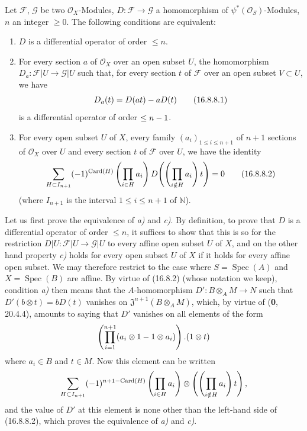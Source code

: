 \begin{proposition}[16.8.8]
\label{IV.16.8.8}
Let $\mathscr{F}$, $\mathscr{G}$ be two $\mathcal{O}_X$-Modules,
$D:\mathscr{F}\to\mathscr{G}$ a homomorphism of
$\psi^*(\mathcal{O}_S)$-Modules, $n$ an integer $\geq0$. The following
conditions are equivalent:
\begin{enumerate}
  \item[\textup{a)}] $D$ is a differential operator of order $\leq n$.
  \item[\textup{b)}] For every section $a$ of $\mathcal{O}_X$ over an open subset
  $U$, the homomorphism $D_a:\mathscr{F}|U\to\mathscr{G}|U$ such that, for
  every section $t$ of $\mathscr{F}$ over an open subset $V\subset U$, we
  have
  \[
    D_a(t)=D(at)- aD(t)
    \tag{16.8.8.1}
    \label{IV.16.8.8.1}
  \]
  is a differential operator of order $\leq n- 1$.
  \item[\textup{c)}] For every open subset $U$ of $X$, every family
  $(a_i)_{1\leq i\leq n+1}$ of $n+1$ sections of $\mathcal{O}_X$ over
  $U$ and every section $t$ of $\mathscr{F}$ over $U$, we have
  the identity
  \[
    \sum_{H\subset I_{n+1}}(- 1)^{\operatorname{Card}(H)}
    \left(\prod_{i\in H}a_i\right)
    D\!\left(\left(\prod_{i\notin H}a_i\right)t\right)=0
    \tag{16.8.8.2}
    \label{IV.16.8.8.2}
  \]
  (where $I_{n+1}$ is the interval $1\leq i\leq n+1$ of $\mathbb{N}$).
\end{enumerate}
\end{proposition}

Let us first prove the equivalence of \emph{a)} and \emph{c)}. By definition, to prove that
$D$ is a differential operator of order $\leq n$, it suffices to show that
this is so for the restriction
$D|U:\mathscr{F}|U\to\mathscr{G}|U$ to every affine open subset $U$ of $X$,
and on the other hand property \emph{c)} holds for every open subset $U$ of $X$ if
it holds for every affine open subset. We may therefore restrict to the case
where $S=\operatorname{Spec}(A)$ and $X=\operatorname{Spec}(B)$ are affine.
By virtue of (16.8.2) (whose notation we keep), condition \emph{a)} then means
that the $A$-homomorphism $D':B\otimes_A M\to N$ such that
$D'(b\otimes t)=bD(t)$ vanishes on
$\mathfrak{J}^{n+1}(B\otimes_A M)$, which, by virtue of (\textbf{0}, 20.4.4), amounts
to saying that $D'$ vanishes on all elements of the form
\[
  \left(\prod_{i=1}^{n+1}(a_i\otimes1- 1\otimes a_i)\right).(1\otimes t)
\]
where $a_i\in B$ and $t\in M$. Now this element can be written
\[
  \sum_{H\subset I_{n+1}}(- 1)^{n+1-\operatorname{Card}(H)}
  \left(\prod_{i\in H}a_i\right)\otimes
  \left(\left(\prod_{i\notin H}a_i\right)t\right),
\]
and the value of $D'$ at this element is none other than the left-hand side
of (16.8.8.2), which proves the equivalence of \emph{a)} and \emph{c)}.


